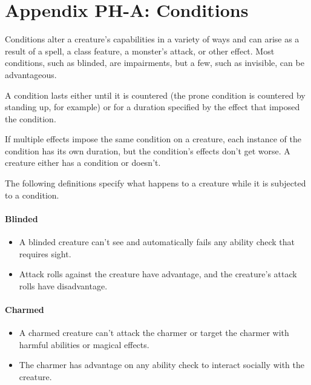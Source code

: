 \documentclass[
]{article}
\date{}
\providecommand{\tightlist}{%
  \setlength{\itemsep}{0pt}\setlength{\parskip}{0pt}}
\begin{document}
\hypertarget{appendix-ph-a-conditions}{%
\section{Appendix PH-A: Conditions}\label{appendix-ph-a-conditions}}

Conditions alter a creature's capabilities in a variety of ways and can
arise as a result of a spell, a class feature, a monster's attack, or
other effect. Most conditions, such as blinded, are impairments, but a
few, such as invisible, can be advantageous.

A condition lasts either until it is countered (the prone condition is
countered by standing up, for example) or for a duration specified by
the effect that imposed the condition.

If multiple effects impose the same condition on a creature, each
instance of the condition has its own duration, but the condition's
effects don't get worse. A creature either has a condition or doesn't.

The following definitions specify what happens to a creature while it is
subjected to a condition.

\hypertarget{blinded}{%
\paragraph{Blinded}\label{blinded}}

\begin{itemize}
\tightlist
\item
  A blinded creature can't see and automatically fails any ability check
  that requires sight.
\item
  Attack rolls against the creature have advantage, and the creature's
  attack rolls have disadvantage.
\end{itemize}

\hypertarget{charmed}{%
\paragraph{Charmed}\label{charmed}}

\begin{itemize}
\tightlist
\item
  A charmed creature can't attack the charmer or target the charmer with
  harmful abilities or magical effects.
\item
  The charmer has advantage on any ability check to interact socially
  with the creature.
\end{itemize}
\end{document}
